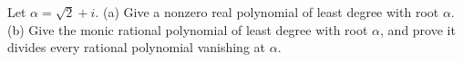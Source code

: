 Let $\alpha=\sqrt2+i$.
(a) Give a nonzero real polynomial of least degree with root $\alpha$.
(b) Give the monic rational polynomial of least degree with root $\alpha$, and prove it divides every rational polynomial vanishing at $\alpha$.
